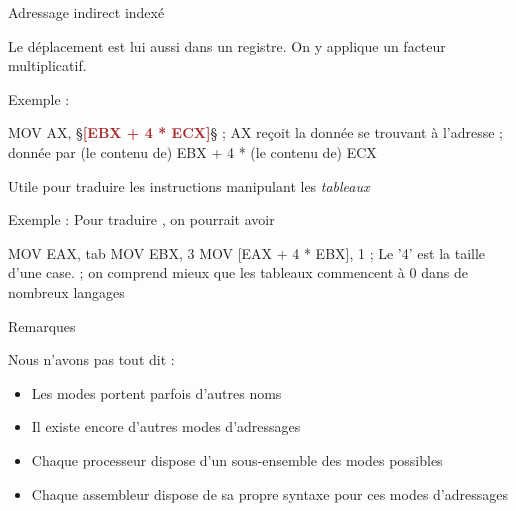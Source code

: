 \documentclass[14pt]{beamer}
\begin{document}
\begin{frame}[fragile]{Adressage indirect indexé}

Le déplacement est lui aussi dans un registre. On y applique un facteur multiplicatif.

\bigskip
Exemple :
\begin{Asm}
	MOV AX, §\textcolor{brown}{\textbf{[EBX + 4 * ECX]}}§    ; AX reçoit la donnée se trouvant à l'adresse
	                     ; donnée par (le contenu de) EBX + 4 * (le contenu de) ECX 
\end{Asm}

\bigskip
Utile pour traduire les instructions manipulant les \emph{tableaux}

\bigskip
Exemple : Pour traduire , on pourrait avoir
\begin{Asm}
	MOV EAX, tab               
	MOV EBX,  3 
	MOV [EAX + 4 * EBX], 1         ; Le '4' est la taille d'une case.
	; on comprend mieux que les tableaux commencent à 0 dans de nombreux langages
\end{Asm}
\end{frame}

\begin{frame}[fragile]{Remarques}

Nous n'avons pas tout dit :
\begin{itemize}
\item Les modes portent parfois d'autres noms
\item Il existe encore d'autres modes d'adressages
\item Chaque processeur dispose d'un sous-ensemble des modes possibles
\item Chaque assembleur dispose de sa propre syntaxe pour ces modes d'adressages
\end{itemize}
\end{frame}

\end{document}
